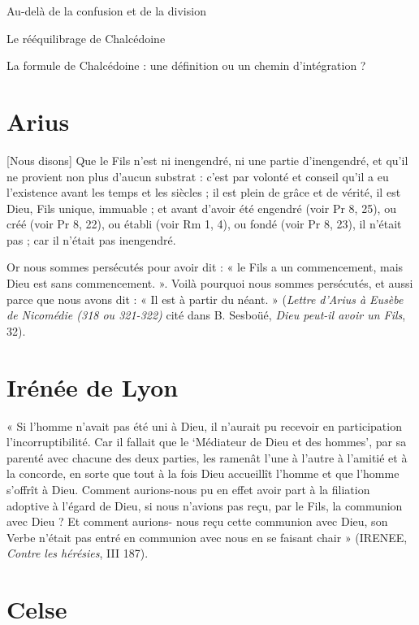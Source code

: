   
  
  
    Au-delà de la confusion et de la division
  
    Le rééquilibrage de Chalcédoine
  
    La formule de Chalcédoine : une définition ou un chemin
    d'intégration ?
  


\hypertarget{arius}{%
\section{Arius}\label{arius}}


{[}Nous disons{]} Que le Fils n'est ni inengendré, ni une partie
d'inengendré, et qu'il ne provient non plus d'aucun substrat : c'est par
volonté et conseil qu'il a eu l'existence avant les temps et les siècles
; il est plein de grâce et de vérité, il est Dieu, Fils unique, immuable
; et avant d'avoir été engendré (voir Pr 8, 25), ou créé (voir Pr 8,
22), ou établi (voir Rm 1, 4), ou fondé (voir Pr 8, 23), il n'était pas
; car il n'était pas inengendré.

Or nous sommes persécutés pour avoir dit : « le Fils a un commencement,
mais Dieu est sans commencement. ». Voilà pourquoi nous sommes
persécutés, et aussi parce que nous avons dit : « Il est à partir du
néant. » (\emph{Lettre d'Arius à Eusèbe de Nicomédie (318 ou 321-322)}
cité dans B. Sesboüé, \emph{Dieu peut-il avoir un Fils}, 32).


\hypertarget{iruxe9nuxe9e-de-lyon}{%
\section{Irénée de Lyon}\label{iruxe9nuxe9e-de-lyon}}


« Si l'homme n'avait pas été uni à Dieu, il n'aurait pu recevoir en
participation l'incorruptibilité. Car il fallait que le `Médiateur de
Dieu et des hommes', par sa parenté avec chacune des deux parties, les
ramenât l'une à l'autre à l'amitié et à la concorde, en sorte que tout à
la fois Dieu accueillît l'homme et que l'homme s'offrît à Dieu. Comment
aurions-nous pu en effet avoir part à la filiation adoptive à l'égard de
Dieu, si nous n'avions pas reçu, par le Fils, la communion avec Dieu ?
Et comment aurions- nous reçu cette communion avec Dieu, son Verbe
n'était pas entré en communion avec nous en se faisant chair » (IRENEE,
\emph{Contre les hérésies}, III 187).


\hypertarget{celse}{%
\section{Celse}\label{celse}}


